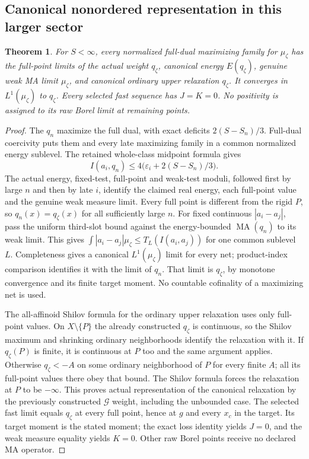 \documentclass[11pt]{article}
\newtheorem{theorem}{Theorem}
\newcommand{\MA}{\operatorname{MA}}
\begin{document}
\subsection{Canonical nonordered representation in this larger sector}
\begin{theorem}\label{branch:recognition}
For $S<\infty$, every normalized full-dual maximizing family for
$\mu_\zeta$ has the full-point limits of the actual weight $q_\zeta$,
canonical energy $E(q_\zeta)$, genuine weak MA limit $\mu_\zeta$, and
canonical ordinary upper relaxation $q_\zeta$. It converges in
$L^1(\mu_\zeta)$ to $q_\zeta$. Every selected fast sequence has $J=K=0$.
No positivity is assigned to its raw Borel limit at remaining points.
\end{theorem}
\begin{proof}
The $q_n$ maximize the full dual, with exact deficits
$2(S-S_n)/3$. Full-dual coercivity puts them and every late maximizing
family in a common normalized energy sublevel. The retained whole-class
midpoint formula gives
\[
 I(a_i,q_n)\le4\bigl(\varepsilon_i+2(S-S_n)/3\bigr).
\]
The actual energy, fixed-test, full-point and weak-test moduli, followed
first by large $n$ and then by late $i$, identify the claimed real energy,
each full-point value and the genuine weak measure limit. Every full point
is different from the rigid $P$, so $q_n(x)=q_\zeta(x)$ for all sufficiently
large $n$. For fixed continuous $|a_i-a_j|$, pass the uniform third-slot
bound against the energy-bounded $\MA(q_n)$ to its weak limit. This gives
$\int|a_i-a_j|\mu_\zeta\le T_L(I(a_i,a_j))$ for one common sublevel $L$.
Completeness gives a canonical $L^1(\mu_\zeta)$ limit for every net;
product-index comparison identifies it with the limit of $q_n$.
That limit is $q_\zeta$, by monotone convergence and its finite target
moment. No countable cofinality of a maximizing net is used.

The all-affinoid Shilov formula for the ordinary upper relaxation uses
only full-point values. On $X\setminus\{P\}$ the already constructed
$q_\zeta$ is continuous, so the Shilov maximum and shrinking ordinary
neighborhoods identify the relaxation with it. If $q_\zeta(P)$ is finite,
it is continuous at $P$ too and the same argument applies. Otherwise
$q_\zeta<-A$ on some ordinary neighborhood of $P$ for every finite $A$;
all its full-point values there obey that bound. The Shilov formula
forces the relaxation at $P$ to be $-\infty$. This proves actual
representation of the canonical relaxation by the previously constructed
$\mathcal G$ weight, including the unbounded case.
The selected fast limit equals $q_\zeta$ at every full point, hence at
$g$ and every $x_c$ in the target. Its target moment is the stated moment;
the exact loss identity yields $J=0$, and the weak measure equality yields
$K=0$. Other raw Borel points receive no declared MA operator.
\end{proof}
\end{document}
